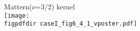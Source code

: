 \documentclass[landscape,a1,final]{a0poster} %
\def\figpdfdir{fig/} %
\begin{document}
\begin{minipage}{1\linewidth}
\begin{minipage}[t]{0.345\textwidth}
\begin{minipage}[t]{0.48\textwidth}
\begin{minipage}[t]{0.45\textwidth}
\end{minipage}
\begin{minipage}[t]{0.50\textwidth}
\vspace{-0.5cm}
\hspace{0.25\textwidth}  {\tiny Mattern($\nu$=3/2) kernel}\\
\texttt{[image: \\figpdfdir caseI\_fig6\_4\_1\_vposter.pdf]}

\end{minipage}

\end{minipage}




\end{minipage} %
\hspace{0.02\linewidth} 
\end{minipage} %
\end{document}
